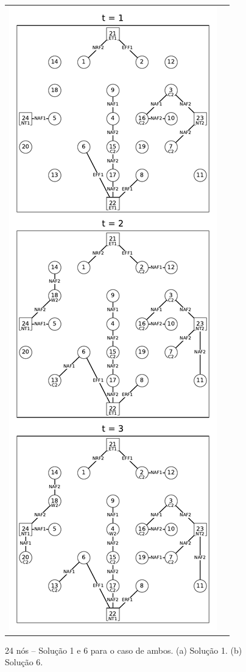 \newpage
\begin{figure}[H]%
\centering
\caption{24 nós -- Solução 1 e 6 para o caso de ambos. (a) Solução 1. (b) Solução 6.}
\begin{tabular}{cc}
    \includegraphics[width=0.49\columnwidth]{cap4/resultados/24_both1.pdf} & 

\end{tabular}
\end{figure}
